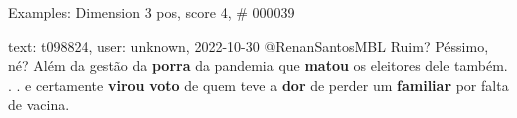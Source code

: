\begin{frame}{Examples: Dimension 3 pos, score 4, \# 000039}
\footnotesize
\begin{exampleblock}{text: t098824, user: unknown, 2022-10-30}
@RenanSantosMBL Ruim? Péssimo, né? Além da gestão da \textbf{porra} da pandemia 
que \textbf{matou} os eleitores dele também. . . e certamente \textbf{virou} 
\textbf{voto} de quem teve a \textbf{dor} de perder um \textbf{familiar} por 
falta de vacina. 
\end{exampleblock}
\end{frame}
